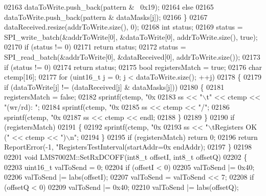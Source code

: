 \begin{DoxyCode}
{{{{{{{{{{{{{{{{{{{{{{{{{{{{{{{{{{{{{{{{{{{{{{{{{{{{{{{{{02163             dataToWrite.push\_back(pattern & ~0x19);
02164         \textcolor{keywordflow}{else}
02165             dataToWrite.push\_back(pattern & dataMasks[j]);
02166     \}
02167     dataReceived.resize(addrToWrite.size(), 0);
02168     \textcolor{keywordtype}{int} status;
02169     status = SPI_write_batch(&addrToWrite[0], &dataToWrite[0], addrToWrite.size(), \textcolor{keyword}{true});
02170     \textcolor{keywordflow}{if} (status != 0)
02171         \textcolor{keywordflow}{return} status;
02172     status = SPI_read_batch(&addrToWrite[0], &dataReceived[0], addrToWrite.size());
02173     \textcolor{keywordflow}{if} (status != 0)
02174         \textcolor{keywordflow}{return} status;
02175     \textcolor{keywordtype}{bool} registersMatch = \textcolor{keyword}{true};
02176     \textcolor{keywordtype}{char} ctemp[16];
02177     \textcolor{keywordflow}{for} (uint16\_t j = 0; j < dataToWrite.size(); ++j)
02178     \{
02179         \textcolor{keywordflow}{if} (dataToWrite[j] != (dataReceived[j] & dataMasks[j]))
02180         \{
02181             registersMatch = \textcolor{keyword}{false};
02182             sprintf(ctemp, \textcolor{stringliteral}{"0x%
02183             ss << \textcolor{stringliteral}{"\(\backslash\)t"} << ctemp << \textcolor{stringliteral}{"(wr/rd): "};
02184             sprintf(ctemp, \textcolor{stringliteral}{"0x%
02185             ss << ctemp << \textcolor{stringliteral}{"/"};
02186             sprintf(ctemp, \textcolor{stringliteral}{"0x%
02187             ss << ctemp << endl;
02188         \}
02189     \}
02190     \textcolor{keywordflow}{if} (registersMatch)
02191     \{
02192         sprintf(ctemp, \textcolor{stringliteral}{"0x%
02193         ss << \textcolor{stringliteral}{"\(\backslash\)tRegisters OK ("} << ctemp << \textcolor{stringliteral}{")\(\backslash\)n"};
02194     \}
02195     \textcolor{keywordflow}{if} (registersMatch) \textcolor{keywordflow}{return} 0;
02196     \textcolor{keywordflow}{return} ReportError(-1, \textcolor{stringliteral}{"RegistersTestInterval(startAddr=0x%
      endAddr);
02197 \}
02198 
02201 \textcolor{keywordtype}{void} LMS7002M::SetRxDCOFF(int8\_t offsetI, int8\_t offsetQ)
02202 \{
02203     uint16\_t valToSend = 0;
02204     \textcolor{keywordflow}{if} (offsetI < 0)
02205         valToSend |= 0x40;
02206     valToSend |= labs(offsetI);
02207     valToSend = valToSend << 7;
02208     \textcolor{keywordflow}{if} (offsetQ < 0)
02209         valToSend |= 0x40;
02210     valToSend |= labs(offsetQ);
}}}}}}}}}}}}}}}}}}}}}}}}}}}}}}}}}}}}}}}}}}}}}}}}}}}}}}}}}}}}}}
\end{DoxyCode}
